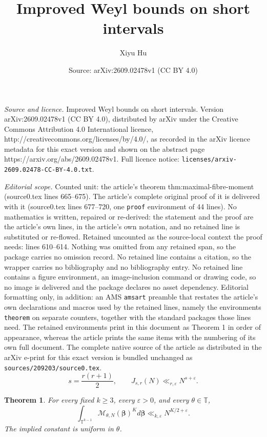 \documentclass[10pt,a4paper]{amsart}
\title{Improved Weyl bounds on short intervals}
\author{Xiyu Hu}
\date{Source: arXiv:2609.02478v1 (CC BY 4.0)}
\newtheorem{theorem}{Theorem}
\newcommand{\T}{\mathbb T}
\newcommand{\cM}{\mathcal M}
\begin{document}
\maketitle

\noindent\emph{Source and licence.} Improved Weyl bounds on short intervals. Version arXiv:2609.02478v1 (CC BY 4.0), distributed by arXiv under the Creative Commons Attribution 4.0 International licence, http://creativecommons.org/licenses/by/4.0/, as recorded in the arXiv licence metadata for this exact version and shown on the abstract page https://arxiv.org/abs/2609.02478v1. Full licence notice: \texttt{licenses/arxiv-2609.02478-CC-BY-4.0.txt}.\par\smallskip

\noindent\textit{Editorial scope.} Counted unit: the article's theorem thm:maximal-fibre-moment (source0.tex lines 665--675). The article's complete original proof of it is delivered with it (source0.tex lines 677--720, one \texttt{proof} environment of 44 lines). No mathematics is written, repaired or re-derived: the statement and the proof are the article's own lines, in the article's own notation, and no retained line is substituted or re-flowed.  Retained uncounted as the source-local context the proof needs: lines 610--614.  Nothing was omitted from any retained span, so the package carries no omission record.  No retained line contains a citation, so the wrapper carries no bibliography and no bibliography entry.  No retained line contains a figure environment, an image-inclusion command or drawing code, so no image is delivered and the package declares no asset dependency.  Editorial formatting only, in addition: an AMS \texttt{amsart} preamble that restates the article's own declarations and macros used by the retained lines, namely the environments \texttt{theorem} on separate counters, together with the standard packages those lines need.  The retained environments print in this document as Theorem 1 in order of appearance, whereas the article prints the same items with the numbering of its own full document.  The complete native source of the article as distributed in the arXiv e-print for this exact version is bundled unchanged as \texttt{sources/209203/source0.tex}.
\begin{equation}\label{eq:critical-vmvt}
  s=\frac{r(r+1)}2,
  \qquad
  J_{s,r}(N)\ll_{r,\varepsilon}N^{s+\varepsilon}.
\end{equation}

\begin{theorem}\label{thm:maximal-fibre-moment}
For every fixed $k\ge3$, every $\varepsilon>0$, and every $\theta\in\T$,
\begin{equation}\label{eq:maximal-fibre-moment}
  \int_{\T^{k-1}}
  \cM_{\theta,N}(\boldsymbol\beta)^K
  d\boldsymbol\beta
  \ll_{k,\varepsilon}
  N^{K/2+\varepsilon}.
\end{equation}
The implied constant is uniform in $\theta$.
\end{theorem}
\end{document}
